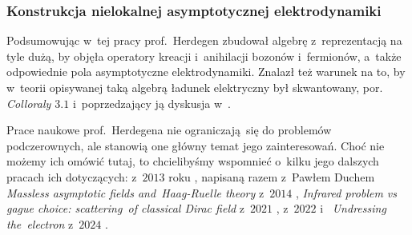 \documentclass[10pt,t]{beamer}
\begin{document}
\begin{frame}
  \frametitle{Konstrukcja nielokalnej asymptotycznej
    elektrodynamiki}


  Podsumowując w~tej pracy prof.~Herdegen zbudował algebrę z~reprezentacją
  na tyle dużą, by objęła operatory kreacji i~anihilacji bozonów
  i~fermionów, a~także odpowiednie pola asymptotyczne elektrodynamiki.
  Znalazł też warunek na to, by w~teorii opisywanej taką algebrą ładunek
  elektryczny był skwantowany, por. \textit{Colloraly $3.1$}
  i~poprzedzający ją dyskusja
  w~\parencite{Herdegen-Semidirect-product-of-CCR-and-CAR-algebras-ETC-Pub-1998}.

  Prace naukowe prof.~Herdegena nie ograniczają~się do problemów
  podczerownych, ale stanowią one główny temat jego zainteresowań. Choć nie
  możemy ich omówić tutaj, to chcielibyśmy wspomnieć o~kilku jego dalszych
  pracach ich dotyczących:
   z~$2013$ roku
  \parencite{Herdegen-Infraparticle-Problem-Asymptotic-Fields-ETC-Pub-2013},
  napisaną razem z~Pawłem Duchem 
  {\textit{Massless asymptotic fields and~Haag-Ruelle theory}} z~$2014$
  \parencite{Duch-Herdegen-Massless-asymptotic-fields-and-ETC-Pub-2014},
  {\textit{Infrared problem vs gague choice: scattering~of classical Dirac
      field}} z~$2021$
  \parencite{Herdegen-Infrared-Problem-vs-Gauge-Choice-ETC-Ver-2021},
   z~$2022$
  \parencite{Herdegen-Almost-radial-gauge-ETC-Pub-2022}
  i~
  {\textit{Undressing the~electron}} z~$2024$
  \parencite{Herdegen-Undressing-the-electron-Pub-2024}.

\end{frame}









\end{document}
